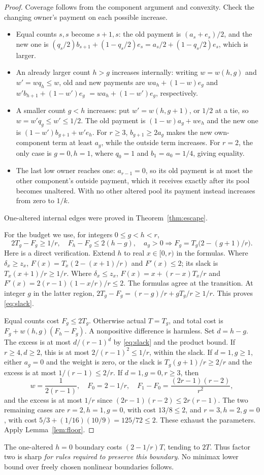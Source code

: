 \documentclass[11pt]{article}
\theoremstyle{definition}\newtheorem{definition}[theorem]{Definition}
\theoremstyle{remark}\newtheorem{remark}[theorem]{Remark}
\begin{document}
\begin{proof}
Coverage follows from the component argument and convexity. Check the changing
owner's payment on each possible increase.
\begin{itemize}
\item Equal counts $s,s$ become $s+1,s$: the old payment is
$(a_s+e_s)/2$, and the new one is
$(q_s/2)b_{s+1}+(1-q_s/2)e_s=a_s/2+(1-q_s/2)e_s$, which is larger.
\item An already larger count $h>g$ increases internally: writing
$w=w(h,g)$ and $w'=wq_h\le w$, old and new payments are
$wa_h+(1-w)e_g$ and $w'b_{h+1}+(1-w')e_g$
$=wa_h+(1-w')e_g$, respectively.
\item A smaller count $g<h$ increases: put $w'=w(h,g+1)$, or $1/2$ at a
tie, so $w=w'q_g\le w'\le1/2$. The old payment is
$(1-w)a_g+we_h$ and the new one is $(1-w')b_{g+1}+w'e_h$.
For $r\ge3$, $b_{g+1}\ge2a_g$ makes the new own-component term at least
$a_g$, while the outside term increases. For $r=2$, the only case is
$g=0,h=1$, where $q_0=1$ and $b_1=a_0=1/4$, giving equality.
\item The last low owner reaches one: $a_{r-1}=0$, so its old payment is
at most the other component's outside payment, which it receives exactly
after its pool becomes unaltered. With no other altered pool its payment
instead increases from zero to $1/k$.
\end{itemize}
One-altered internal edges were proved in Theorem~\ref{thm:escape}.

For the budget we use, for integers $0\le g<h<r$,
\begin{equation}\label{eq:slack}
 2T_g-F_g\ge1/r,\quad F_h-F_g\le2(h-g),\quad
 a_g>0\Longrightarrow F_g=T_g\bigl(2-(g+1)/r\bigr).
\end{equation}
Here is a direct verification. Extend $h$ to real $x\in[0,r)$ in the formulas.
Where $\delta_x\ge z_x$, $F(x)=T_x(2-(x+1)/r)$ and $F'(x)\le2$;
its slack is $T_x(x+1)/r\ge1/r$. Where $\delta_x\le z_x$,
$F(x)=x+(r-x)T_x/r$ and
$F'(x)=2(r-1)(1-x/r)/r\le2$. The formulas agree at the transition.
At integer $g$ in the latter region,
$2T_g-F_g=(r-g)/r+gT_g/r\ge1/r$. This proves \eqref{eq:slack}.

Equal counts cost $F_g\le2T_g$. Otherwise actual $T=T_g$, and total cost is
$F_g+w(h,g)(F_h-F_g)$. A nonpositive difference is harmless. Set $d=h-g$.
The excess is at most $d/(r-1)^d$ by \eqref{eq:slack} and the product bound.
If $r\ge4,d\ge2$, this is at most $2/(r-1)^2\le1/r$, within the slack.
If $d=1,g\ge1$, either $a_g=0$ and the weight is zero, or the slack is
$T_g(g+1)/r\ge2/r$ and the excess is at most $1/(r-1)\le2/r$.
If $d=1,g=0,r\ge3$, then
\[
 w=\frac1{2(r-1)},\quad F_0=2-1/r,\quad
 F_1-F_0=\frac{(2r-1)(r-2)}{r^2},
\]
and the excess is at most $1/r$ since
$(2r-1)(r-2)\le2r(r-1)$.
The two remaining cases are $r=2,h=1,g=0$, with cost $13/8\le2$, and
$r=3,h=2,g=0$, with cost
$5/3+(1/16)(10/9)=125/72\le2$. These exhaust the parameters.
Apply Lemma~\ref{lem:floor}.
\end{proof}
The one-altered $h=0$ boundary costs $(2-1/r)T$, tending to $2T$.
Thus factor two is sharp \emph{for rules required to preserve this boundary}.
No minimax lower bound over freely chosen nonlinear boundaries follows.
\end{document}

